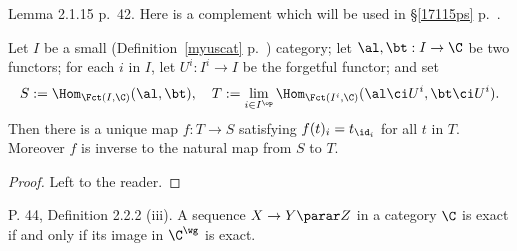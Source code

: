 \documentclass[12pt]{article}
\theoremstyle{remark}
\theoremstyle{definition}
\begin{document}
%

\begin{s}
Lemma 2.1.15 p.~42. Here is a complement which will be used in \S\ref{17115ps} p.~. 

\begin{thm}
Let $I$ be a small (Definition~\ref{myuscat} p.~) category; let $\al,\bt:I\to\C$ be two functors; for each $i$ in $I$, let $U^i:I^i\to I$ be the forgetful functor; and set 
$$
S:=\Hom_{\Fct(I,\C)}(\al,\bt),\quad T:=\lim_{i\in I^{\op}}\Hom_{\Fct(I^i,\C)}(\al\ci U^i,\bt\ci U^i).
$$ 
Then there is a unique map $f:T\to S$ satisfying $f(t)_i=t_{\id_i}$ for all $t$ in $T$. Moreover $f$ is inverse to the natural map from $S$ to $T$. 
\end{thm} 

\begin{proof}
Left to the reader.
\end{proof}
\end{s} 


\begin{s} 
P. 44, Definition 2.2.2 (iii). A sequence $X\to Y\parar Z$ in a category $\C$ is exact if and only if its image in $\C^\wg$ is exact.
\end{s}


\end{document}
